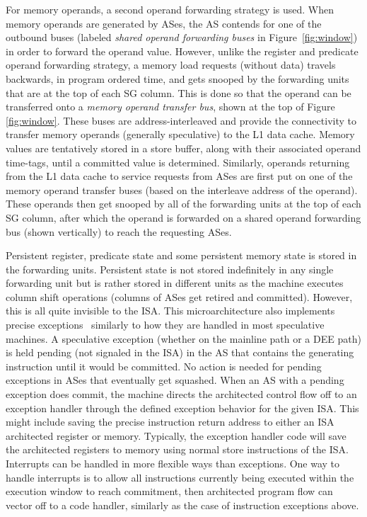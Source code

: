 \documentclass[10pt,twocolumn,dvips]{article}
\begin{document}
For memory operands, a second operand forwarding strategy is used.
When memory operands are generated by ASes, the AS contends
for one of the outbound buses 
(labeled {\em shared operand forwarding buses} in Figure~\ref{fig:window}) 
in order to forward the operand value.
However, unlike the register and predicate operand forwarding
strategy, a memory load requests (without data)
travels backwards, in program ordered
time, and gets snooped by the forwarding units that are at the top
of each SG column.  This is done so that the operand can
be transferred onto a {\em memory operand transfer bus}, shown
at the top of Figure \ref{fig:window}.  
These buses are address-interleaved and
provide the connectivity to transfer memory operands (generally
speculative) to the L1 data cache.
Memory values are tentatively stored in a store buffer, along with 
their associated operand
time-tags, until a committed value is determined.
Similarly, operands returning from the L1 data cache to service requests
from ASes are first put on one of the memory operand transfer buses (based
on the interleave address of the operand).  These operands then get snooped
by all of the forwarding units at the top of each SG
column, after which the operand is forwarded on a shared operand
forwarding bus (shown vertically) to reach the requesting ASes.

Persistent register, predicate state and some persistent
memory state is stored in the forwarding units.
Persistent state is not stored indefinitely in any single forwarding
unit but is rather stored in different units as the machine
executes column shift operations (columns of ASes get retired
and committed).  However, this is all quite invisible to the ISA.
This microarchitecture also implements precise exceptions~\cite{Smi88}
similarly to how they
are handled in most speculative machines.  
A speculative exception (whether on the mainline path or a DEE path)
is held pending (not signaled in the ISA)
in the AS that contains the generating
instruction until it would be committed.
No action is needed for pending exceptions in ASes that eventually
get squashed.
When an AS with a pending exception does commit, the machine directs the
architected control flow off to an exception handler through
the defined exception behavior for the given ISA.
This might include saving the precise instruction return
address to either an ISA architected register or memory.
Typically, the exception handler code will save the architected
registers to memory using normal
store instructions of the ISA.
Interrupts can be handled in more flexible ways than exceptions.
One way to handle interrupts is to allow all instructions
currently being executed within the execution window to reach
commitment, then architected program flow can vector off to
a code handler, similarly as the case of instruction exceptions above.
%
%
\end{document}
